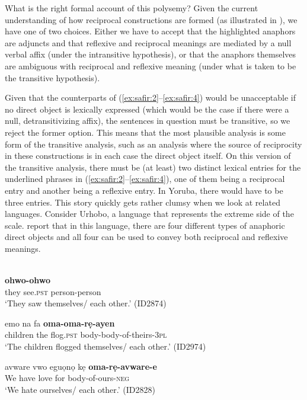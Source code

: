 \documentclass[output=paper]{langsci/langscibook}
\begin{document}
What is the right formal account of this polysemy? Given the current understanding of how reciprocal constructions are formed (as illustrated in ), we have one of two choices. Either we have to accept that the highlighted anaphors are adjuncts and that reflexive and reciprocal meanings are mediated by a null verbal affix (under the intransitive hypothesis), or that the anaphors themselves are ambiguous with reciprocal and reflexive meaning (under what is taken to be the transitive hypothesis). 

Given that the counterparts of (\ref{ex:safir:2}--\ref{ex:safir:4}) would be unacceptable if no direct object is lexically expressed (which would be the case if there were a null, detransitivizing affix), the sentences in question must be transitive, so we reject the former option. This means that the most plausible analysis is some form of the transitive analysis, such as an analysis where the source of reciprocity in these constructions is in each case the direct object itself. On this version of the transitive analysis, there must be (at least) two distinct lexical entries for the underlined phrases in (\ref{ex:safir:2}--\ref{ex:safir:4}), one of them being a reciprocal entry and another being a reflexive entry. In Yoruba, there would have to be three entries. This story quickly gets rather clumsy when we look at related languages. Consider Urhobo, a language that represents the extreme side of the scale. \citet{AzizaSafir2006} report that in this language, there are four different types of anaphoric direct objects and all four can be used to convey both reciprocal and reflexive meanings. 


\ea\label{ex:}
 \\
\ea\label{ex:}
     \textbf{{ohwo-ohwo}} \\
       they   see.\textsc{pst}   person-person \\
\glt   ‘They saw themselves/ each other.’ (ID2874)

\ex
\gll emo    na  fa    \textbf{{oma-oma-rẹ-ayen}}\\
 children  the  flog.\textsc{pst}  body-body-of-theirs-\textsc{3pl}\\
\glt   ‘The children flogged themselves/ each other.’ (ID2974)

\ex
\glt avware   vwo  eguọnọ   kẹ   \textbf{oma-rẹ-avware-e}\\
       We     have   love     for   body-of-ours-\textsc{neg}  \\
\glt   ‘We hate ourselves/ each other.’  (ID2828)
\end{document}
